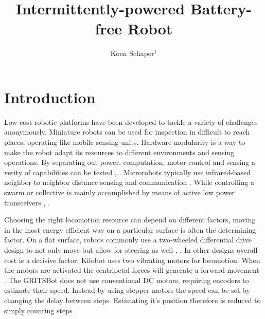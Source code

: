\documentclass[letterpaper, 10 pt, conference]{ieeeconf}  %
\title{\LARGE \bf
Intermittently-powered Battery-free Robot
}
\author{Koen Schaper$^{1}$ %
}
\begin{document}
\maketitle
\thispagestyle{empty}
\pagestyle{empty}






\section{Introduction}



Low cost robotic platforms have been developed to tackle a variety of challenges anonymously.
Miniature robots can be used for inspection in difficult to reach places, operating like mobile sensing units.
Hardware modularity is a way to make the robot adapt its resources to different environments and sensing operations.
By separating out power, computation, motor control and sensing a verity of capabilities can be tested \cite{sabelhaus_icra_2013}, \cite{pickem_icra_2015}.
Microrobots typically use infrared-based neighbor to neighbor distance sensing and communication \cite{rubenstein_icra_2012}.
While controlling a swarm or collective is mainly accomplished by means of active low power transceivers \cite{sabelhaus_icra_2013}, \cite{pickem_icra_2015}. 


Choosing the right locomotion resource can depend on different factors, moving in the most energy efficient way on a particular surface is often the determining factor.
On a flat surface, robots commonly use a two-wheeled differential drive design to not only move but allow for steering as well \cite{sabelhaus_icra_2013}, \cite{pickem_icra_2015}. 
In other designs overall cost is a decisive factor, Kilobot uses two vibrating motors for locomotion.
When the motors are activated the centripetal forces will generate a forward movement \cite{rubenstein_icra_2012}.
The GRITSBot does not use conventional DC motors, requiring encoders to estimate their speed. 
Instead by using stepper motors the speed can be set by changing the delay between steps. 
Estimating it's position therefore is reduced to simply counting steps \cite{pickem_icra_2015}. 
\end{document}
